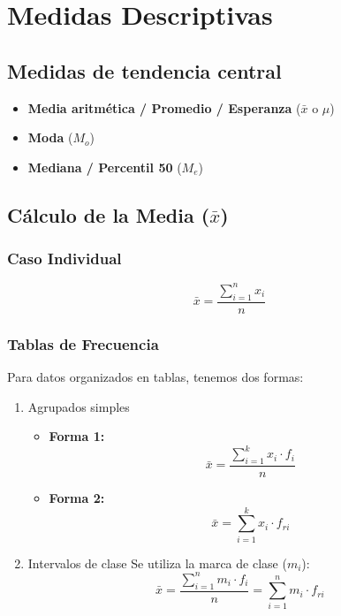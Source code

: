 \documentclass[11pt]{article}
\begin{document}
\section{Medidas Descriptivas}
\label{sec:org22e6d95}
\subsection{Medidas de tendencia central}
\label{sec:org95309da}
\begin{itemize}
\item \textbf{Media aritmética / Promedio / Esperanza} (\(\bar{x}\) o \(\mu\))
\item \textbf{Moda} (\(M_o\))
\item \textbf{Mediana / Percentil 50} (\(M_e\))
\end{itemize}

\subsection{Cálculo de la Media (\(\bar{x}\))}
\label{sec:org2e47109}

\subsubsection{Caso Individual}
\label{sec:orgca7114b}
$$\displaystyle \bar{x} = \frac{\sum_{i=1}^{n} x_i}{n}$$

\subsubsection{Tablas de Frecuencia}
\label{sec:org78f411d}
Para datos organizados en tablas, tenemos dos formas:

\begin{enumerate}
\item Agrupados simples
\label{sec:org3857200}
\begin{itemize}
\item \textbf{Forma 1:}
$$\displaystyle \bar{x} = \frac{\sum_{i=1}^{k} x_i \cdot f_i}{n}$$
\item \textbf{Forma 2:}
$$\displaystyle \bar{x} = \sum_{i=1}^{k} x_i \cdot f_{ri}$$
\end{itemize}

\item Intervalos de clase
\label{sec:org76aa100}
Se utiliza la marca de clase (\(m_i\)):
$$\displaystyle \bar{x} = \frac{\sum_{i=1}^{n} m_i \cdot f_i}{n} = \sum_{i=1}^{n} m_i \cdot f_{ri}$$
\end{enumerate}
\end{document}
